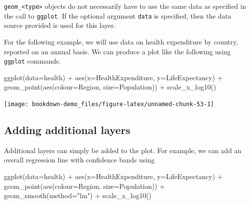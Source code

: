 \documentclass[
]{book}
\newenvironment{Shaded}{\begin{snugshade}}{\end{snugshade}}
\newcommand{\AttributeTok}[1]{\textcolor[rgb]{0.77,0.63,0.00}{#1}}
\newcommand{\FunctionTok}[1]{\textcolor[rgb]{0.00,0.00,0.00}{#1}}
\newcommand{\NormalTok}[1]{#1}
\newcommand{\SpecialCharTok}[1]{\textcolor[rgb]{0.00,0.00,0.00}{#1}}
\newcommand{\StringTok}[1]{\textcolor[rgb]{0.31,0.60,0.02}{#1}}
\begin{document}
\texttt{geom\_\textless{}type\textgreater{}} objects do not necessarily have to use the same data as specified in the call to \texttt{ggplot}. If the optional argument \texttt{data} is specified, then the data source provided is used for this layer.

For the following example, we will use data on health expenditure by country, reported on an annual basis. We can produce a plot like the following using \texttt{ggplot} commands.

\begin{Shaded}
\begin{Highlighting}[]
\FunctionTok{ggplot}\NormalTok{(}\AttributeTok{data=}\NormalTok{health) }\SpecialCharTok{+} 
  \FunctionTok{aes}\NormalTok{(}\AttributeTok{x=}\NormalTok{HealthExpenditure,  }\AttributeTok{y=}\NormalTok{LifeExpectancy) }\SpecialCharTok{+}
  \FunctionTok{geom\_point}\NormalTok{(}\FunctionTok{aes}\NormalTok{(}\AttributeTok{colour=}\NormalTok{Region, }\AttributeTok{size=}\NormalTok{Population)) }\SpecialCharTok{+}
  \FunctionTok{scale\_x\_log10}\NormalTok{()}
\end{Highlighting}
\end{Shaded}

\texttt{[image: bookdown-demo\_files/figure-latex/unnamed-chunk-53-1]}

\hypertarget{adding-additional-layers}{%
\subsection{Adding additional layers}\label{adding-additional-layers}}

Additional layers can simply be added to the plot. For example, we can add an overall regression line with confidence bands using

\begin{Shaded}
\begin{Highlighting}[]
\FunctionTok{ggplot}\NormalTok{(}\AttributeTok{data=}\NormalTok{health) }\SpecialCharTok{+} 
    \FunctionTok{aes}\NormalTok{(}\AttributeTok{x=}\NormalTok{HealthExpenditure,  }\AttributeTok{y=}\NormalTok{LifeExpectancy) }\SpecialCharTok{+}
    \FunctionTok{geom\_point}\NormalTok{(}\FunctionTok{aes}\NormalTok{(}\AttributeTok{colour=}\NormalTok{Region, }\AttributeTok{size=}\NormalTok{Population)) }\SpecialCharTok{+}
    \FunctionTok{geom\_smooth}\NormalTok{(}\AttributeTok{method=}\StringTok{"lm"}\NormalTok{)  }\SpecialCharTok{+}
    \FunctionTok{scale\_x\_log10}\NormalTok{()}
\end{Highlighting}
\end{Shaded}
\end{document}
